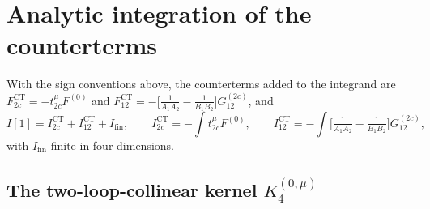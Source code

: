 \documentclass[11pt]{article}
\newcommand{\CT}{\mathrm{CT}}
\newcommand{\fin}{\mathrm{fin}}
\begin{document}
\section{Analytic integration of the counterterms}
\label{sec:int}

With the sign conventions above, the counterterms added to the integrand are
$F^{\CT}_{2c}=-t^{\mu}_{2c}F^{(0)}$ and
$F^{\CT}_{12}=-\big[\tfrac{1}{A_1A_2}-\tfrac{1}{B_1B_2}\big]G^{(2c)}_{12}$, and
\begin{equation}
I[1]=I^{\CT}_{2c}+I^{\CT}_{12}+I_{\fin},
\qquad
I^{\CT}_{2c}=-\!\int t^{\mu}_{2c}F^{(0)},
\qquad
I^{\CT}_{12}=-\!\int \Big[\tfrac{1}{A_1A_2}-\tfrac{1}{B_1B_2}\Big]G^{(2c)}_{12},
\end{equation}
with $I_{\fin}$ finite in four dimensions.

\subsection{The two-loop-collinear kernel $K_4^{(0,\mu)}$}
\label{sec:K4}
\end{document}
